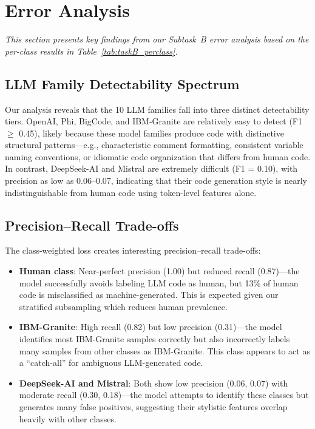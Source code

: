 \documentclass[11pt]{article}
\begin{document}
\section{Error Analysis}
\label{sec:error}

\textit{This section presents key findings from our Subtask~B error analysis based on the per-class results in Table~\ref{tab:taskB_perclass}.}

\subsection{LLM Family Detectability Spectrum}

Our analysis reveals that the 10 LLM families fall into three distinct detectability tiers. OpenAI, Phi, BigCode, and IBM-Granite are relatively easy to detect (F1 $\geq$ 0.45), likely because these model families produce code with distinctive structural patterns---e.g., characteristic comment formatting, consistent variable naming conventions, or idiomatic code organization that differs from human code. In contrast, DeepSeek-AI and Mistral are extremely difficult (F1 = 0.10), with precision as low as 0.06--0.07, indicating that their code generation style is nearly indistinguishable from human code using token-level features alone.

\subsection{Precision--Recall Trade-offs}

The class-weighted loss creates interesting precision--recall trade-offs:
\begin{itemize}
    \item \textbf{Human class}: Near-perfect precision (1.00) but reduced recall (0.87)---the model successfully avoids labeling LLM code as human, but 13\% of human code is misclassified as machine-generated. This is expected given our stratified subsampling which reduces human prevalence.
    \item \textbf{IBM-Granite}: High recall (0.82) but low precision (0.31)---the model identifies most IBM-Granite samples correctly but also incorrectly labels many samples from other classes as IBM-Granite. This class appears to act as a ``catch-all'' for ambiguous LLM-generated code.
    \item \textbf{DeepSeek-AI and Mistral}: Both show low precision (0.06, 0.07) with moderate recall (0.30, 0.18)---the model attempts to identify these classes but generates many false positives, suggesting their stylistic features overlap heavily with other classes.
\end{itemize}
\end{document}
